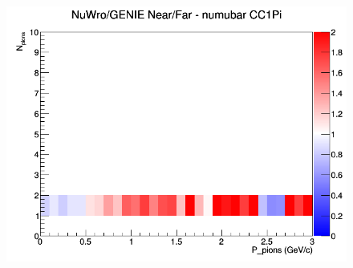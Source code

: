 \documentclass[12pt]{article}
\begin{document}
\begin{figure}[h]
\endminipage
{}
\includegraphics[width=\linewidth]{N_P/nominal/pions/ratios/CC1Pi_NuWro_GENIE_numubar_NF_N_P.png}
\endminipage
\newline
\end{figure}
\clearpage
\end{document}
